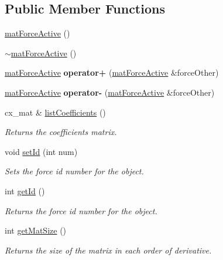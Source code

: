 \subsection*{Public Member Functions}
\begin{DoxyCompactItemize}
\item 
\hyperlink{classmat_force_active_addc507c90f98f3a9bb9bfe57897df3ca}{mat\-Force\-Active} ()
\item 
\hyperlink{classmat_force_active_aba1957829e2109f03c6fc03990258210}{$\sim$mat\-Force\-Active} ()
\item 
\hypertarget{classmat_force_active_a8bc32fc773bd6c29d8bd7790194a10cf}{\hyperlink{classmat_force_active}{mat\-Force\-Active} {\bfseries operator+} (\hyperlink{classmat_force_active}{mat\-Force\-Active} \&force\-Other)}\label{classmat_force_active_a8bc32fc773bd6c29d8bd7790194a10cf}

\item 
\hypertarget{classmat_force_active_a150bda87debf622dacb439e8e983fa3c}{\hyperlink{classmat_force_active}{mat\-Force\-Active} {\bfseries operator-\/} (\hyperlink{classmat_force_active}{mat\-Force\-Active} \&force\-Other)}\label{classmat_force_active_a150bda87debf622dacb439e8e983fa3c}

\item 
cx\-\_\-mat \& \hyperlink{classmat_force_active_a34d3cedfef07d6136bab26988ffc7905}{list\-Coefficients} ()
\begin{DoxyCompactList}\small\item\em Returns the coefficients matrix. \end{DoxyCompactList}\item 
void \hyperlink{classmat_force_active_a2784051c78388741bf1cf66d18df0b2c}{set\-Id} (int num)
\begin{DoxyCompactList}\small\item\em Sets the force id number for the object. \end{DoxyCompactList}\item 
int \hyperlink{classmat_force_active_a48a33b65af2085268a2f03fb212a39d3}{get\-Id} ()
\begin{DoxyCompactList}\small\item\em Returns the force id number for the object. \end{DoxyCompactList}\item 
int \hyperlink{classmat_force_active_aa17a21eb9a9ea9e1a36fae4dbc2b09bf}{get\-Mat\-Size} ()
\begin{DoxyCompactList}\small\item\em Returns the size of the matrix in each order of derivative. \end{DoxyCompactList}\end{DoxyCompactItemize}

